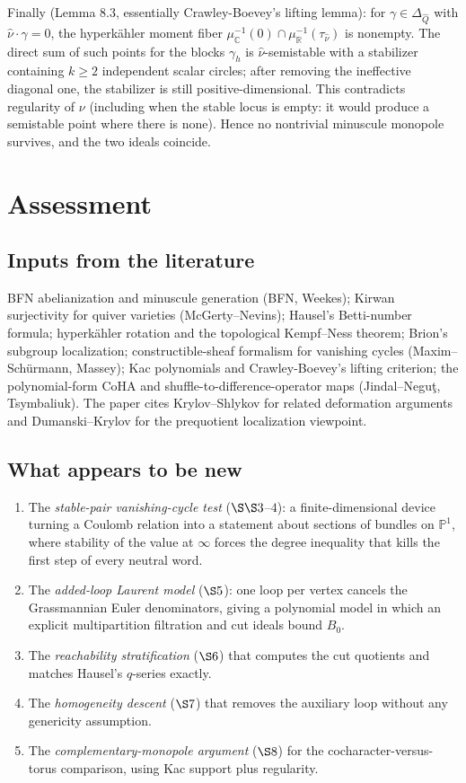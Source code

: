\documentclass[11pt]{amsart}
\theoremstyle{remark}
\newcommand{\C}{\mathbb{C}}
\newcommand{\PP}{\mathbb{P}}
\begin{document}
Finally (Lemma 8.3, essentially Crawley-Boevey's lifting lemma): for
$\gamma\in\Delta_{\widehat Q}$ with $\widehat\nu\cdot\gamma=0$, the
hyperk\"ahler moment fiber $\mu_\C^{-1}(0)\cap\mu_{\mathbb R}^{-1}(\tau_{\widehat\nu})$
is nonempty.  The direct sum of such points for the blocks $\gamma_h$ is
$\widehat\nu$-semistable with a stabilizer containing $k\ge2$ independent
scalar circles; after removing the ineffective diagonal one, the stabilizer
is still positive-dimensional.  This contradicts regularity of $\nu$
(including when the stable locus is empty: it would produce a semistable
point where there is none).  Hence no nontrivial minuscule monopole
survives, and the two ideals coincide.

\section{Assessment}\label{sec:assessment}

\subsection*{Inputs from the literature}
BFN abelianization and minuscule generation (BFN, Weekes); Kirwan
surjectivity for quiver varieties (McGerty--Nevins); Hausel's Betti-number
formula; hyperk\"ahler rotation and the topological Kempf--Ness theorem;
Brion's subgroup localization; constructible-sheaf formalism for vanishing
cycles (Maxim--Sch\"urmann, Massey); Kac polynomials and Crawley-Boevey's
lifting criterion; the polynomial-form CoHA and shuffle-to-difference-operator
maps (Jindal--Negu\c t, Tsymbaliuk).  The paper cites Krylov--Shlykov
\cite[Remark 1.15]{KS25} for related deformation arguments and
Dumanski--Krylov \cite[Prop.~2.3]{DK25} for the prequotient localization
viewpoint.

\subsection*{What appears to be new}
\begin{enumerate}[leftmargin=2em]
\item The \emph{stable-pair vanishing-cycle test} ($\S\S3$--$4$): a
finite-dimensional device turning a Coulomb relation into a statement
about sections of bundles on $\PP^1$, where stability of the value at
$\infty$ forces the degree inequality that kills the first step of every
neutral word.
\item The \emph{added-loop Laurent model} ($\S5$): one loop per vertex
cancels the Grassmannian Euler denominators, giving a polynomial model in
which an explicit multipartition filtration and cut ideals bound $B_0$.
\item The \emph{reachability stratification} ($\S6$) that computes the cut
quotients and matches Hausel's $q$-series exactly.
\item The \emph{homogeneity descent} ($\S7$) that removes the auxiliary
loop without any genericity assumption.
\item The \emph{complementary-monopole argument} ($\S8$) for the
cocharacter-versus-torus comparison, using Kac support plus regularity.
\end{enumerate}
\end{document}
